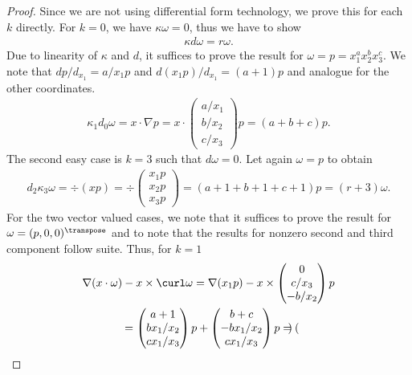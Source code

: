\begin{proof}
  Since we are not using differential form technology, we prove this
  for each $k$ directly. For $k=0$, we have $\kappa\omega = 0$, thus
  we have to show
  \begin{gather}
    \kappa d\omega = r\omega.
  \end{gather}
  Due to linearity of $\kappa$ and $d$, it suffices to prove the
  result for $\omega = p=x_1^ax_2^bx_3^c$. We note that $dp/d_{x_1} =
  a/x_1 p$ and $d(x_1 p)/d_{x_1} = (a+1) p$ and analogue for the other
  coordinates.
  \begin{gather}
    \kappa_1 d_0\omega = x\cdot \nabla p = x\cdot
    \begin{pmatrix}
      a/x_1\\b/x_2\\c/x_3
    \end{pmatrix}p
    = (a+b+c)p.
  \end{gather}
  The second easy case is $k=3$ such that $d\omega = 0$. Let again
  $\omega = p$ to obtain
  \begin{gather}
    d_2\kappa_3 \omega = \div(xp) = \div
    \begin{pmatrix}
      x_1 p \\x_2 p \\x_3 p
    \end{pmatrix}
    = (a+1+b+1+c+1) p = (r+3) \omega.
  \end{gather}
  For the two vector valued cases, we note that it suffices to prove
  the result for $\omega = (p,0,0)^\transpose$ and to note that the results for
  nonzero second and third component follow suite. Thus, for $k=1$
  \begin{multline}
    \nabla (x\cdot \omega) - x\times \curl \omega
    = \nabla(x_1 p) - x\times
    \begin{pmatrix}
      0\\c/x_3 \\ -b/x_2
    \end{pmatrix}p
    \\
    =
    \begin{pmatrix}
      a+1 \\ bx_1/x_2\\ cx_1/x_3
    \end{pmatrix}p
    +
    \begin{pmatrix}
      b+c \\ -bx_1/x_2\\cx_1/x_3
    \end{pmatrix}p
    =
    \begin{pmatrix}

\end{pmatrix}
\end{multline}
\end{proof}

